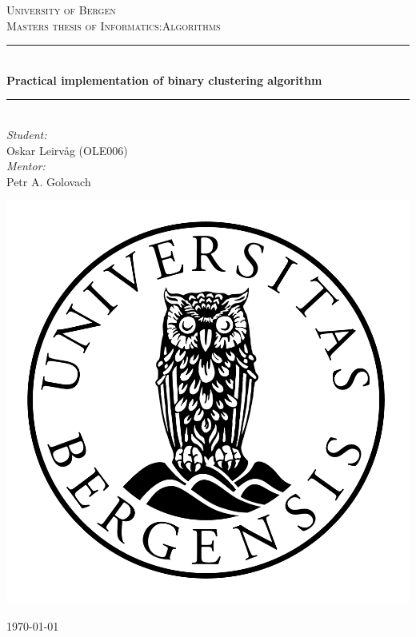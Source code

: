 \begin{titlepage}
    \newcommand{\HRule}{\rule{\linewidth}{0.5mm}}
    \center

    \textsc{\LARGE University of Bergen}\\[1.5cm] %
    \textsc{\large Masters thesis of Informatics:Algorithms}\\[0.5cm] %

    \HRule \\[0.4cm]
    { \huge \bfseries Practical implementation of binary clustering algorithm}\\[0.4cm] %
    \HRule \\[1.5cm]

    \Large \emph{Student:}\\
    Oskar Leirvåg (OLE006)\\
    \Large \emph{Mentor:}\\
	Petr A. Golovach
    \\[2cm] %

    \centerline{\includegraphics[scale=0.5]{figures/canvas}} %

    {\large \today}\\[3cm] %

    \vfill
\end{titlepage}
